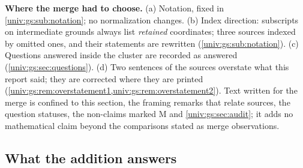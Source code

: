 \documentclass[11pt,letterpaper]{article}
\numberwithin{equation}{section}
\theoremstyle{definition}
\theoremstyle{remark}
\begin{document}
\textbf{Where the merge had to choose.} (a) Notation, fixed in
\cref{univ:gs:sub:notation}; no normalization changes. (b) Index direction:
subscripts on intermediate grounds always list \emph{retained} coordinates;
three sources indexed by omitted ones, and their statements are rewritten
(\cref{univ:gs:sub:notation}). (c) Questions answered inside the cluster are
recorded as answered (\cref{univ:gs:sec:questions}). (d) Two sentences of the
sources overstate what this report said; they are corrected where they are
printed (\cref{univ:gs:rem:overstatement1,univ:gs:rem:overstatement2}). Text
written for the merge is confined to this section, the framing remarks that
relate sources, the question statuses, the non-claims marked M and
\cref{univ:gs:sec:audit}; it adds no mathematical claim beyond the
comparisons stated as merge observations.

\subsection{What the addition answers}\label{univ:gs:sub:answers}
\end{document}
